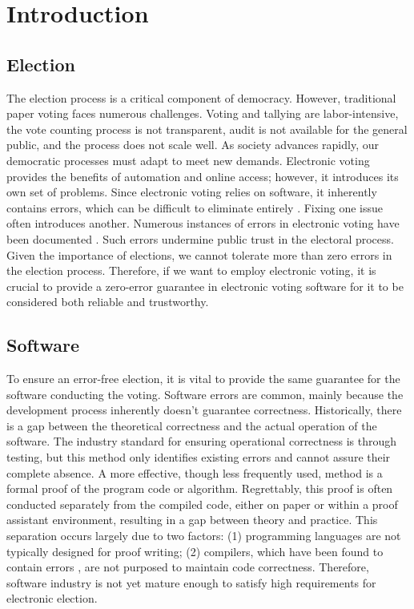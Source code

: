 \chapter{Introduction}\label{chap:introduction}
\section{Election}
The election process is a critical component of democracy. 
However, traditional paper voting faces numerous challenges. 
Voting and tallying are labor-intensive, the vote counting process is not 
transparent, audit is not available for the general public, and the process 
does not scale well. As society advances rapidly, our democratic processes must 
adapt to meet new demands. Electronic voting provides the benefits of automation 
and online access; however, it introduces its own set of problems. Since electronic 
voting relies on software, it inherently contains errors, which can be difficult to 
eliminate entirely \cite{brooks1975mythical}. Fixing one issue often introduces another. 
Numerous instances of errors in electronic voting have been 
documented \cite{ChangFong2016TheCS, Halderman2015TheNS, Haines2022RunningTR}. 
Such errors undermine public trust in the electoral process. Given the importance 
of elections, we cannot tolerate more than zero errors in the election process. 
Therefore, if we want to employ electronic voting, it is crucial to provide a 
zero-error guarantee in electronic voting software for it to be considered both 
reliable and trustworthy.
\section{Software} 
To ensure an error-free election, it is vital to provide the same guarantee 
for the software conducting the voting. Software errors are common, mainly 
because the development process inherently doesn't guarantee correctness. 
Historically, there is a gap \label{gap} between the theoretical correctness 
and the actual operation of the software. The industry standard for ensuring 
operational correctness is through testing, but this method only identifies 
existing errors and cannot assure their complete absence. A more effective, 
though less frequently used, method is a formal proof of the program code or 
algorithm. Regrettably, this proof is often conducted separately from the compiled 
code, either on paper or within a proof assistant environment, resulting in a gap 
between theory and practice. This separation occurs largely due to two 
factors: (1) programming languages are not typically designed for proof 
writing; (2) compilers, which have been found to contain 
errors \cite{Yang2011FindingAU}, are not purposed to maintain code 
correctness. Therefore, software industry is not yet mature enough 
to satisfy high requirements for electronic election.
